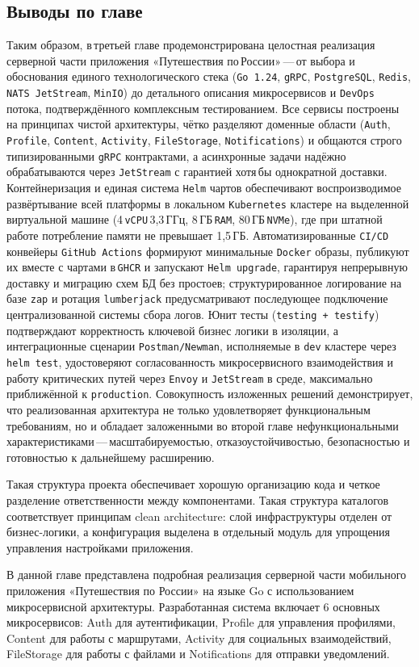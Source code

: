 \subsection*{Выводы по главе}
Таким образом, в третьей главе продемонстрирована целостная реализация серверной части приложения «Путешествия по России» — от выбора и обоснования единого технологического стека (\texttt{Go 1.24}, \texttt{gRPC}, \texttt{PostgreSQL}, \texttt{Redis}, \texttt{NATS JetStream}, \texttt{MinIO}) до детального описания микросервисов и \texttt{DevOps} потока, подтверждённого комплексным тестированием. Все сервисы построены на принципах чистой архитектуры, чётко разделяют доменные области (\texttt{Auth}, \texttt{Profile}, \texttt{Content}, \texttt{Activity}, \texttt{FileStorage}, \texttt{Notifications}) и общаются строго типизированными \texttt{gRPC} контрактами, а асинхронные задачи надёжно обрабатываются через \texttt{JetStream} с гарантией хотя бы однократной доставки. Контейнеризация и единая система \texttt{Helm} чартов обеспечивают воспроизводимое развёртывание всей платформы в локальном \texttt{Kubernetes} кластере на выделенной виртуальной машине (4 \texttt{vCPU} 3,3 ГГц, 8 ГБ \texttt{RAM}, 80 ГБ \texttt{NVMe}), где при штатной работе потребление памяти не превышает 1,5 ГБ. Автоматизированные \texttt{CI/CD} конвейеры \texttt{GitHub Actions} формируют минимальные \texttt{Docker} образы, публикуют их вместе с чартами в \texttt{GHCR} и запускают \texttt{Helm upgrade}, гарантируя непрерывную доставку и миграцию схем БД без простоев; структурированное логирование на базе \texttt{zap} и ротация \texttt{lumberjack} предусматривают последующее подключение централизованной системы сбора логов. Юнит тесты (\texttt{testing + testify}) подтверждают корректность ключевой бизнес логики в изоляции, а интеграционные сценарии \texttt{Postman/Newman}, исполняемые в \texttt{dev} кластере через \texttt{helm test}, удостоверяют согласованность микросервисного взаимодействия и работу критических путей через \texttt{Envoy} и \texttt{JetStream} в среде, максимально приближённой к \texttt{production}. Совокупность изложенных решений демонстрирует, что реализованная архитектура не только удовлетворяет функциональным требованиям, но и обладает заложенными во второй главе нефункциональными характеристиками — масштабируемостью, отказоустойчивостью, безопасностью и готовностью к дальнейшему расширению.

\noindent Такая структура проекта обеспечивает хорошую организацию кода и четкое разделение ответственности между компонентами. Такая структура каталогов соответствует принципам clean architecture: слой инфраструктуры отделен от бизнес-логики, а конфигурация выделена в отдельный модуль для упрощения управления настройками приложения.

\noindent В данной главе представлена подробная реализация серверной части мобильного приложения «Путешествия по России» на языке Go с использованием микросервисной архитектуры. Разработанная система включает 6 основных микросервисов: Auth для аутентификации, Profile для управления профилями, Content для работы с маршрутами, Activity для социальных взаимодействий, FileStorage для работы с файлами и Notifications для отправки уведомлений.
